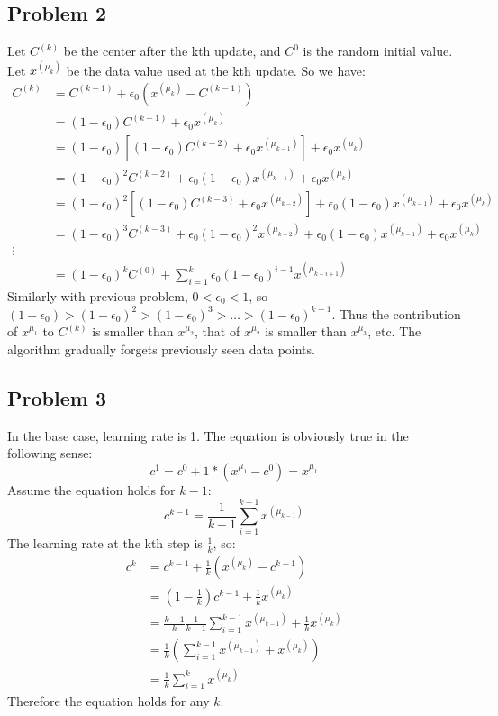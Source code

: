 \documentclass{article}
\begin{document}
\subsection*{Problem 2}
Let $C^{(k)}$ be the center after the kth update, and $C^0$ is the random initial value. Let $x^{(\mu_k)}$ be the data value used at the kth update. So we have:
\begin{align*}
C^{(k)} &= C^{(k-1)} + \epsilon_0(x^{(\mu_k)} - C^{(k-1)}) \\
&= (1-\epsilon_0)C^{(k-1)} + \epsilon_0 x^{(\mu_k)} \\
&= (1-\epsilon_0)[(1-\epsilon_0)C^{(k-2)} + \epsilon_0 x^{(\mu_{k-1})}]+ \epsilon_0 x^{(\mu_k)} \\
&= (1-\epsilon_0)^2C^{(k-2)} + \epsilon_0 (1-\epsilon_0) x^{(\mu_{k-1})} + \epsilon_0 x^{(\mu_k)} \\
&= (1-\epsilon_0)^2[(1-\epsilon_0)C^{(k-3)} + \epsilon_0 x^{(\mu_{k-2})}] + \epsilon_0 (1-\epsilon_0) x^{(\mu_{k-1})}+ \epsilon_0 x^{(\mu_k)} \\
&= (1-\epsilon_0)^3C^{(k-3)} + \epsilon_0 (1-\epsilon_0)^2 x^{(\mu_{k-2})} + \epsilon_0 (1-\epsilon_0) x^{(\mu_{k-1})}+ \epsilon_0 x^{(\mu_k)} \\
\vdots \\
&= (1-\epsilon_0)^k C^{(0)} + \sum^{k}_{i=1}\epsilon_0 (1-\epsilon_0)^{i-1} x^{(\mu_{k-i+1})}
\end{align*}
Similarly with previous problem, $0 < \epsilon_0 < 1$, so $(1- \epsilon_0) > (1- \epsilon_0)^2 > (1- \epsilon_0)^3 > \hdots > (1- \epsilon_0)^{k-1}$. Thus the contribution of $x^{\mu_1}$ to $C^{(k)}$ is smaller than $x^{\mu_2}$, that of $x^{\mu_2}$ is smaller than $x^{\mu_3}$, etc. The algorithm gradually forgets previously seen data points. 

\subsection*{Problem 3}
In the base case, learning rate is 1. The equation is obviously true in the following sense:
\begin{equation*}
c^1 = c^0 + 1*(x^{\mu_1} - c^0) = x^{\mu_1}
\end{equation*}
Assume the equation holds for $k-1$:
\begin{equation*}
c^{k-1} = \frac{1}{k-1} \sum^{k-1}_{i=1} x^{(\mu_{k-1})} 
\end{equation*}
The learning rate at the kth step is $\frac{1}{k}$, so:
\begin{align*}
c^{k} &= c^{k-1} + \frac{1}{k}(x^{(\mu_{k})} - c^{k-1}) \\
&= (1- \frac{1}{k}) c^{k-1} + \frac{1}{k}x^{(\mu_{k})} \\
&= \frac{k-1}{k}\frac{1}{k-1} \sum^{k-1}_{i=1} x^{(\mu_{k-1})}  + \frac{1}{k}x^{(\mu_{k})} \\
&= \frac{1}{k}(\sum^{k-1}_{i=1} x^{(\mu_{k-1})} + x^{(\mu_{k})}) \\
&= \frac{1}{k}\sum^{k}_{i=1} x^{(\mu_{k})}
\end{align*}
Therefore the equation holds for any $k$. 
\end{document}
